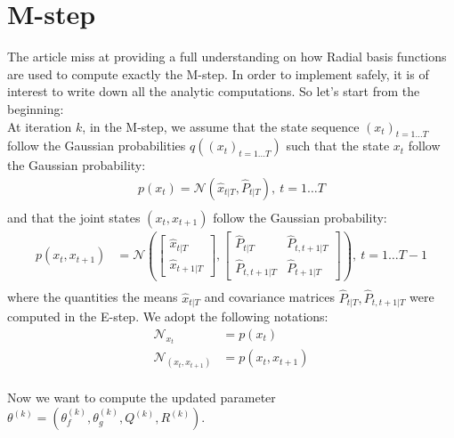 
\section{M-step}

The article miss at providing a full understanding on how Radial basis functions are used to compute exactly the M-step. In order to implement safely, it is of interest to write down all the analytic computations. So let's start from the beginning:\\

At iteration $k$, in the M-step, we assume that the state sequence $(x_t)_{t=1 \ldots T}$ follow the Gaussian probabilities $q \left( (x_t)_{t=1 \ldots T} \right)$ such that the state $x_t$ follow the Gaussian probability:
\begin{align*}
  p(x_t) = \mathcal{N}\left( \hat{x}_{t|T}, \hat{P}_{t|T} \right), \  t=1 \ldots T\\
\end{align*}
and that the joint states $(x_t, x_{t+1})$ follow the Gaussian probability:
\begin{align*}
  p(x_t, x_{t+1}) &=
  \mathcal{N}
    \left(
      \left[
        \begin{array}{c} \hat{x}_{t|T} \\ \hat{x}_{t+1|T} \end{array}
      \right],
      \left[
        \begin{array}{cc} \hat{P}_{t|T} & \hat{P}_{t,t+1|T}\\ \hat{P}_{t,t+1|T} & \hat{P}_{t+1|T} \end{array}
      \right]
    \right), \  t=1 \ldots T-1\\
\end{align*}
where the quantities the means $\hat{x}_{t|T}$ and covariance matrices $\hat{P}_{t|T}, \hat{P}_{t,t+1|T}$ were computed in the E-step.
We adopt the following notations:
\begin{align*}
  \mathcal{N}_{x_t} &= p(x_t)\\
  \mathcal{N}_{(x_t,x_{t+1})} &= p(x_t, x_{t+1})\\
\end{align*}

Now we want to compute the updated parameter $\theta^{(k)} = \left( \theta_f^{(k)}, \theta_g^{(k)}, Q^{(k)}, R^{(k)} \right)$.


